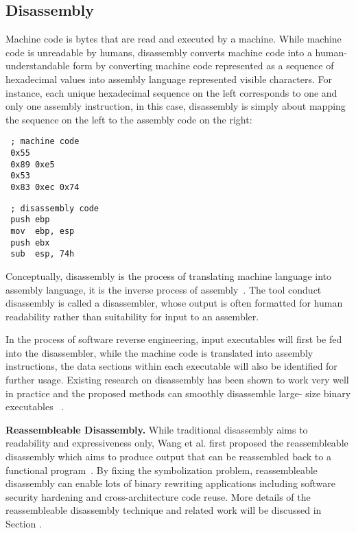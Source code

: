 \subsection{Disassembly} \label{sec:background-disassembly}

Machine code is bytes that are read and executed by a machine. While machine
code is unreadable by humans, disassembly converts machine code into a
human-understandable form by converting machine code represented as a sequence
of hexadecimal values into assembly language represented visible characters.
For instance, each unique hexadecimal sequence on the left corresponds to one
and only one assembly instruction, in this case, disassembly is simply about
mapping the sequence on the left to the assembly code on the right:

\vspace*{3pt}
\noindent\hspace*{36pt}\begin{minipage}{.40\linewidth}
\begin{lstlisting}
 ; machine code
 0x55
 0x89 0xe5
 0x53
 0x83 0xec 0x74
\end{lstlisting}
\end{minipage}\hspace*{24pt}
\begin{minipage}{.40\linewidth}
\begin{lstlisting}
 ; disassembly code
 push ebp
 mov  ebp, esp
 push ebx
 sub  esp, 74h
\end{lstlisting}
\end{minipage}

Conceptually, disassembly is the process of translating machine language into
assembly language, it is the inverse process of
assembly~\cite{schwarz2002disassembly,wang2015reassembleable,bauman2018superset}.
The tool conduct disassembly is called a disassembler, whose output is often
formatted for human readability rather than suitability for input to an
assembler.

In the process of software reverse engineering, input executables will first be
fed into the disassembler, while the machine code is translated into assembly
instructions, the data sections within each executable will also be identified
for further usage. Existing research on disassembly has been shown to work
very well in practice and the proposed methods can smoothly disassemble large-
size binary executables
~\cite{balakrishnan2010wysinwyx,kruegel2004static,wang2015reassembleable}.

\noindent \textbf{Reassembleable Disassembly.} While traditional disassembly
aims to readability and expressiveness only, Wang et al. first proposed the
reassembleable disassembly which aims to produce output that can be
reassembled back to a functional program~\cite{wang2015reassembleable}. By
fixing the symbolization problem, reassembleable disassembly can enable lots
of binary rewriting applications including software security hardening and
cross-architecture code reuse. More details of the reassembleable disassembly
technique and related work will be discussed in Section .


